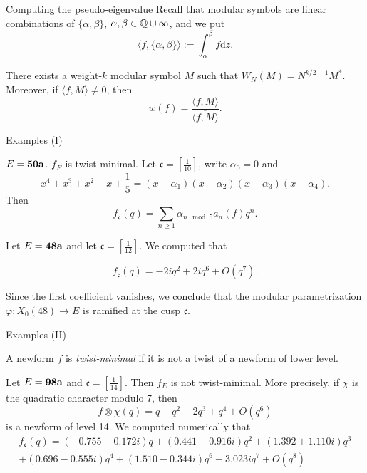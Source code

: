 \documentclass[handout]{beamer}
\newcommand{\fc}{\mathfrak{c}}
\begin{document}
\begin{frame}{Computing the pseudo-eigenvalue}
Recall that modular symbols are linear combinations of $\{\alpha, \beta\}$, $\alpha, \beta \in \mathbb{Q} \cup \infty$, 
and we put 
\[
	\langle f, \{\alpha, \beta\} \rangle := \int_{\alpha}^{\beta} f \textrm{d} z. 
\]
\begin{Lemma}[C.]
There exists a weight-$k$ modular symbol $M$ such that $W_N(M) = N^{k/2 -1} M^*$. Moreover, if $\langle f, M \rangle \neq 0$, then 
\[
	w(f) = \frac{\langle f,M \rangle }{\overline{\langle f,M \rangle}}.
\]
\end{Lemma} 

\end{frame}

\begin{frame}{Examples (I)}

\begin{Example}
$E = {\bf 50a}$. $f_E$ is twist-minimal. Let  $\fc = [\frac{1}{10}]$, write $\alpha_0 = 0$ and 
\[
	x^4 + x^3 + x^2 - x + \frac{1}{5} = (x-\alpha_1) (x-\alpha_2)(x-\alpha_3)(x-\alpha_4).
\]
Then 
\[
	f_{\fc}(q) = \sum_{n \geq 1}  \alpha_{n \mod 5} a_n(f) q^n.
\]
\end{Example}

\begin{Example}
Let $E = {\bf 48a}$ and let $\fc = \left[\frac{1}{12}\right]$.  We computed that 

$$f_\fc(q) =  -2iq^2 + 2iq^6 + O(q^7).$$

Since the first coefficient vanishes, we conclude that the modular parametrization $\varphi: X_0(48) \to E$ is ramified at the cusp $\fc$. 
\end{Example}
\end{frame}


\begin{frame}{Examples (II)}
\begin{Definition}
A newform $f$ is {\it twist-minimal} if it is not a twist of a newform of lower level. 
\end{Definition}
\begin{Example}
Let $E = {\bf 98a}$ and $\fc = [\frac{1}{14}]$. Then $f_E$ is not twist-minimal. More precisely, if $\chi$ is the quadratic character modulo 7, then 
\[
	f \otimes \chi  (q) =  q - q^2 - 2q^3 + q^4 + O(q^6)
\] 
is a newform of level 14.  We computed numerically that 
{\footnotesize
\begin{align*}
f_\fc(q) = \left(-0.755 - 0.172i\right)q + \left(0.441 - 0.916i\right)q^{2} 
+ \left(1.392+ 1.110i\right)q^{3} \\ + \left(0.696 - 0.555i\right)q^{4} 
+ \left(1.510 - 0.344i\right)q^{6} - 3.023i q^{7} + O(q^8) 
\end{align*}
}
\end{Example}
\end{frame}
\end{document}

